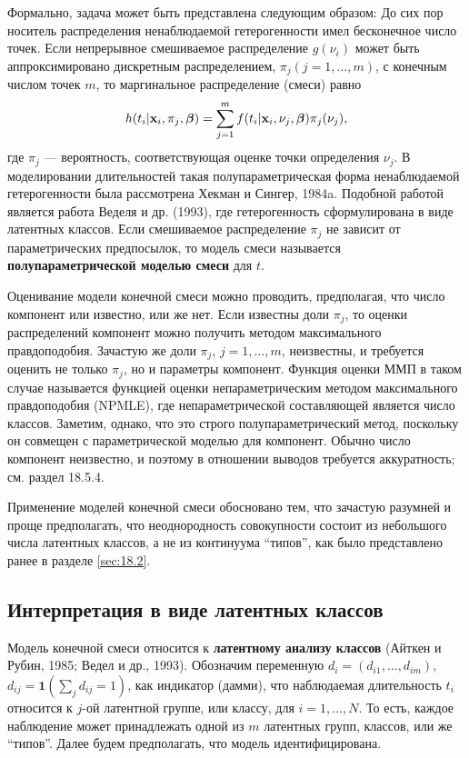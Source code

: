 Формально, задача может быть представлена следующим образом: До сих пор носитель распределения ненаблюдаемой гетерогенности имел бесконечное число точек. Если непрерывное смешиваемое распределение $g(\nu_i)$ может быть аппроксимировано дискретным распределением, $\pi_j(j = 1, \ldots, m)$, с конечным числом точек $m$, то маргинальное распределение (смеси) равно
    \begin{align}
        \label{eq:18.18}
        h(t_i|\mathbf{x}_i,\pi_j,\bm{\beta}) = \sum^{m}_{j=1} f(t_i|\mathbf{x}_i, \nu_j, \bm{\beta}) \pi_j(\nu_j),
    \end{align}
где $\pi_j$ --- вероятность, соответствующая оценке точки определения $\nu_j$. В моделировании длительностей такая полупараметрическая форма ненаблюдаемой гетерогенности была рассмотрена Хекман и Сингер, 1984a. Подобной работой является работа Веделя и др. (1993), где гетерогенность сформулирована в виде латентных классов. Если смешиваемое распределение $\pi_j$ не зависит от параметрических предпосылок, то модель смеси называется \textbf{полупараметрической моделью смеси} для $t$.

Оценивание модели конечной смеси можно проводить, предполагая, что число компонент или известно, или же нет. Если известны доли $\pi_j$, то оценки распределений компонент можно получить методом максимального правдоподобия. Зачастую же доли $\pi_j$, $j=1,\ldots,m$, неизвестны, и требуется оценить не только $\pi_j$, но и параметры компонент. Функция оценки ММП в таком случае называется функцией оценки непараметрическим методом максимального правдоподобия (NPMLE), где непараметрической составляющей является число классов. Заметим, однако, что это строго полупараметрический метод, поскольку он совмещен с параметрической моделью для компонент. Обычно число компонент неизвестно, и поэтому в отношении выводов требуется аккуратность; см. раздел 18.5.4. %

Применение моделей конечной смеси обосновано тем, что зачастую разумней и проще предполагать, что неоднородность совокупности состоит из небольшого числа латентных классов, а не из континуума ``типов'', как было представлено ранее в разделе \ref{sec:18.2}.




\subsection{Интерпретация в виде латентных классов}\label{sec:18.5.2} %

\noindent
Модель конечной смеси относится к \textbf{латентному анализу классов} (Айткен и Рубин, 1985; Ведел и др., 1993). Обозначим переменную $d_{i} = (d_{i1}, \ldots, d_{im})$, $d_{ij} = \textbf{1}(\sum_jd_{ij} = 1)$, как индикатор (дамми), что наблюдаемая длительность $t_i$ относится к $j$-ой латентной группе, или классу, для $i = 1, \ldots, N$. То есть, каждое наблюдение может принадлежать одной из $m$ латентных групп, классов, или же ``типов''. Далее будем предполагать, что модель идентифицирована.

